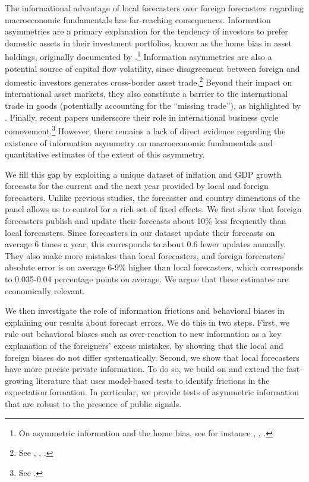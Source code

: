 
\label{sec:introduction}
The informational advantage of local forecasters over foreign forecasters regarding macroeconomic fundamentals has far-reaching consequences. Information asymmetries are a primary explanation for the tendency of investors to prefer domestic assets in their investment portfolios, known as the home bias in asset holdings, originally documented by  \citet{FrenchPoterba1991}.\footnote{On asymmetric information and the home bias, see for instance \citet{Admati1985}, \citet{Portesetal2001}, \citet{DeMarcoetal2021}.} Information asymmetries are also a potential source of capital flow volatility, since disagreement between foreign and domestic investors generates cross-border asset trade.\footnote{See \citet{BrennanCao1997},  \citet{TillevanWincoop2014}, \citet{BenhimaCordonier2022}.} Beyond their impact on international asset markets, they also constitute a barrier to the international trade in goods (potentially accounting for the ``missing trade''), as highlighted by \citet{AndersonvanWincoop2004}. Finally, recent papers underscore their role in international business cycle comovement.\footnote{See \citet{Buietal2021}.} However, there remains a lack of direct evidence regarding the existence of information asymmetry on macroeconomic fundamentals and quantitative estimates of the extent of this asymmetry.

We fill this gap by exploiting a unique dataset of inflation and GDP growth forecasts for the current and the next year provided by local and foreign forecasters. Unlike previous studies, the forecaster and country dimensions of the panel allows us to control for a rich set of fixed effects. We first show that foreign forecasters publish and update their forecasts about 10\% less frequently than local forecasters. Since forecasters in our dataset update their forecasts on average 6 times a year, this corresponds to about 0.6 fewer updates annually. They also make more mistakes than local forecasters, and foreign forecasters' absolute error is on average 6-9\% higher than local forecasters, which corresponds to 0.035-0.04 percentage points on average. We argue that these estimates are economically relevant.

We then investigate the role of information frictions and behavioral biases in explaining our results about forecast errors. We do this in two steps. First, we rule out behavioral biases such as over-reaction to new information as a key explanation of the foreigners' excess mistakes, by showing that the local and foreign biases do not differ systematically. Second, we show that local forecasters have more precise private information. To do so, we build on and extend the fast-growing literature that uses model-based tests to identify frictions in the expectation formation. In particular, we provide tests of asymmetric information that are robust to the presence of public signals.

